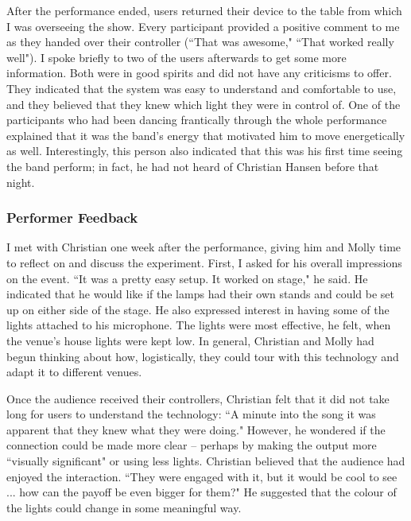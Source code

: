 After the performance ended, users returned their device to the table from which I was overseeing the show. Every participant provided a positive comment to me as they handed over their controller (``That was awesome," ``That worked really well"). I spoke briefly to two of the users afterwards to get some more information. Both were in good spirits and did not have any criticisms to offer. They indicated that the system was easy to understand and comfortable to use, and they believed that they knew which light they were in control of. One of the participants who had been dancing frantically through the whole performance explained that it was the band's energy that motivated him to move energetically as well. Interestingly, this person also indicated that this was his first time seeing the band perform; in fact, he had not heard of Christian Hansen before that night.

\subsubsection{Performer Feedback}

I met with Christian one week after the performance, giving him and Molly time to reflect on and discuss the experiment. First, I asked for his overall impressions on the event. ``It was a pretty easy setup. It worked on stage," he said. He indicated that he would like if the lamps had their own stands and could be set up on either side of the stage. He also expressed interest in having some of the lights attached to his microphone. The lights were most effective, he felt, when the venue's house lights were kept low. In general, Christian and Molly had begun thinking about how, logistically, they could tour with this technology and adapt it to different venues.

Once the audience received their controllers, Christian felt that it did not take long for users to understand the technology: ``A minute into the song it was apparent that they knew what they were doing." However, he wondered if the connection could be made more clear -- perhaps by making the output more ``visually significant" or using less lights. Christian believed that the audience had enjoyed the interaction. ``They were engaged with it, but it would be cool to see ... how can the payoff be even bigger for them?" He suggested that the colour of the lights could change in some meaningful way.

